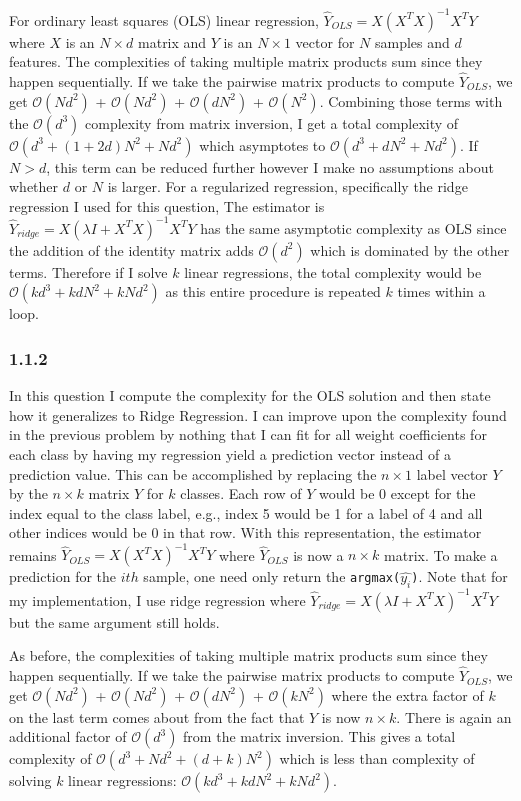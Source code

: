 \documentclass[12pt]{amsart}
\begin{document}
For ordinary least squares (OLS) linear regression, $\hat{Y}_{OLS} = X(X^T X)^{-1}X^T Y$ where $X$ is an $N \times d$ matrix and $Y$ is an $N \times 1$ vector for $N$ samples and $d$ features.  The complexities of taking multiple matrix products sum since they happen sequentially.  If we take the pairwise matrix products to compute $\hat{Y}_{OLS}$, we get $\mathcal{O}(Nd^2)$ + $\mathcal{O}(Nd^2)$ + $\mathcal{O}(dN^2)$ + $\mathcal{O}(N^2)$.  Combining those terms with the $\mathcal{O}(d^3)$ complexity from matrix inversion, I get a total complexity of $\mathcal{O}(d^3 + (1+2d)N^2 + Nd^2)$ which asymptotes to $\mathcal{O}(d^3 + dN^2 + Nd^2)$.  If $N > d$, this term can be reduced further however I make no assumptions about whether $d$ or $N$ is larger.  For a regularized regression, specifically the ridge regression I used for this question, The estimator is $\hat{Y}_{ridge} = X(\lambda I + X^T X)^{-1}X^T Y$ has the same asymptotic complexity as OLS since the addition of the identity matrix adds $\mathcal{O}(d^2)$ which is dominated by the other terms.  Therefore if I solve $k$ linear regressions, the total complexity would be $\mathcal{O}(kd^3 + kdN^2 + kNd^2)$ as this entire procedure is repeated $k$ times within a loop.

\subsubsection*{1.1.2}

In this question I compute the complexity for the OLS solution and then state how it generalizes to Ridge Regression.  I can improve upon the complexity found in the previous problem by nothing that I can fit for all weight coefficients for each class by having my regression yield a prediction vector instead of a prediction value.  This can be accomplished by replacing the $n \times 1$ label vector $Y$ by the $n \times k$ matrix $Y$ for $k$ classes.  Each row of $Y$ would be 0 except for the index equal to the class label, e.g., index 5 would be 1 for a label of 4 and all other indices would be 0 in that row.  With this representation, the estimator remains $\hat{Y}_{OLS} = X(X^T X)^{-1}X^T Y$ where $\hat{Y}_{OLS}$ is now a $n \times k$ matrix.  To make a prediction for the $ith$ sample, one need only return the {\tt argmax($\hat{y_i}$)}.  Note that for my implementation, I use ridge regression where $\hat{Y}_{ridge} = X(\lambda I + X^T X)^{-1}X^T Y$ but the same argument still holds.

As before, the complexities of taking multiple matrix products sum since they happen sequentially.  If we take the pairwise matrix products to compute $\hat{Y}_{OLS}$, we get $\mathcal{O}(Nd^2)$ + $\mathcal{O}(Nd^2)$ + $\mathcal{O}(dN^2)$ + $\mathcal{O}(kN^2)$ where the extra factor of $k$ on the last term comes about from the fact that $Y$ is now $n \times k$.  There is again an additional factor of $\mathcal{O}(d^3)$ from the matrix inversion.  This gives a total complexity of $\mathcal{O}(d^3 + Nd^2 + (d+k)N^2)$ which is less than complexity of solving $k$ linear regressions: $\mathcal{O}(kd^3 + kdN^2 + kNd^2)$.
\end{document}
